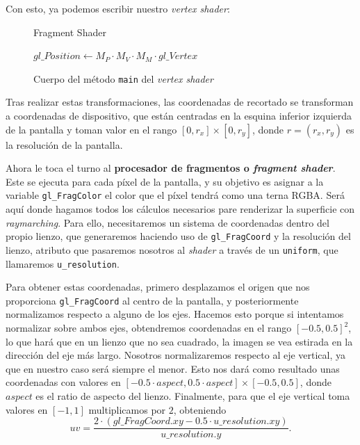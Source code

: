 Con esto, ya podemos escribir nuestro \textit{vertex shader}:
\begin{figure}[ht!]
    \centering
       \begin{algorithm}[H]
            \caption{Fragment Shader}
                $gl\_Position \gets M_P \cdot M_V \cdot M_M \cdot gl\_Vertex$
        \end{algorithm}
    \caption{Cuerpo del método \texttt{main} del \textit{vertex shader}}
    \label{fig:mainVS}
\end{figure}

Tras realizar estas transformaciones, las coordenadas de recortado se transforman a coordenadas de dispositivo, que están centradas en la esquina inferior izquierda de la pantalla y toman valor en el rango $[0,r_x]\times [0,r_y]$, donde $r=(r_x,r_y)$ es la resolución de la pantalla.\newline

Ahora le toca el turno al \textbf{procesador de fragmentos o \textit{fragment shader}}. Este se ejecuta para cada píxel de la pantalla, y su objetivo es asignar a la variable \texttt{gl\_FragColor} el color que el píxel tendrá como una terna RGBA. Será aquí donde hagamos todos los cálculos necesarios pare renderizar la superficie con \textit{raymarching}. Para ello, necesitaremos un sistema de coordenadas dentro del propio lienzo, que generaremos haciendo uso de \texttt{gl\_FragCoord} y la resolución del lienzo, atributo que pasaremos nosotros al \textit{shader} a través de un \texttt{uniform}, que llamaremos \texttt{u\_resolution}.\newline

Para obtener estas coordenadas, primero desplazamos el origen que nos proporciona \texttt{gl\_FragCoord} al centro de la pantalla, y posteriormente normalizamos respecto a alguno de los ejes. Hacemos esto porque si intentamos normalizar sobre ambos ejes, obtendremos coordenadas en el rango $[-0.5,0.5]^2$, lo que hará que en un lienzo que no sea cuadrado, la imagen se vea estirada en la dirección del eje más largo. Nosotros normalizaremos respecto al eje vertical, ya que en nuestro caso será siempre el menor. Esto nos dará como resultado unas coordenadas con valores en $\left[ -0.5\cdot aspect, 0.5\cdot aspect \right] \times [-0.5, 0.5]$, donde $aspect$ es el ratio de aspecto del lienzo. Finalmente, para que el eje vertical toma valores en $[-1,1]$ multiplicamos por $2$, obteniendo
\begin{equation*}
    uv = \frac{2\cdot(gl\_FragCoord.xy - 0.5\cdot u\_resolution.xy)}{u\_resolution.y}.
\end{equation*}

